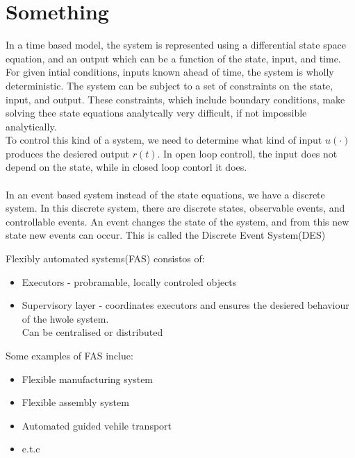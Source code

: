 
\chapter{Something}

{
    In a time based model, the system is represented using a differential state space equation, and an output
    which can be a function of the state, input, and time. For given intial conditions, inputs known ahead
    of time, the system is wholly deterministic. The system can be subject to a set of constraints on the state, input, and output.
    These constraints, which include boundary conditions, make solving thee state equations analytcally very difficult, if not impossible
    analytically.\\
    To control this kind of a system, we need to determine what kind of input $u(\cdot)$ produces the desiered output  $r(t)$.
    In open loop controll, the input does not depend on the state, while in closed loop contorl it does.
\\
\\

    In an event based system instead of the state equations, we have a discrete system. In this discrete system, there are discrete states,
    observable events, and controllable events. An event changes the state of the system, and from this new state new events can occur.
    This is called the Discrete Event System(DES)\\
}

{


    Flexibly automated systems(FAS) consistos of:
    \begin{itemize}
            \item Executors - probramable, locally controled objects
            \item Supervisory layer - coordinates executors and ensures the desiered behaviour of the hwole system. \\
                Can be centralised or distributed
            
    \end{itemize}
    Some examples of FAS inclue:
    \begin{itemize}
            \item Flexible manufacturing system
            \item Flexible assembly system
            \item Automated guided vehile transport
            \item e.t.c
            
    \end{itemize}
}

